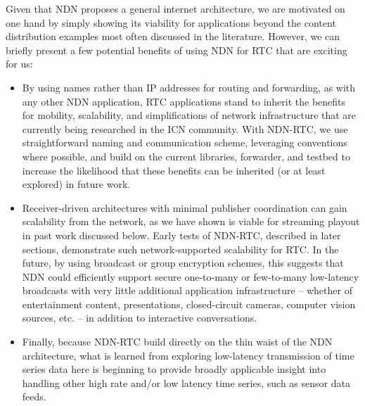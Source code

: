 \documentclass{icn/sig-alternate-2013} %
\newcommand{\ndnrtcName}{NDN-RTC} %
\begin{document}
Given that NDN proposes a general internet architecture, we are motivated on one hand by simply showing its viability for applications beyond the content distribution examples most often discussed in the literature.  However, we can briefly present a few potential benefits of using NDN for RTC that are exciting for us: 
\begin{itemize}
\item By using names rather than IP addresses for routing and forwarding, as with any other NDN application, RTC applications stand to inherit the benefits for mobility, scalability, and simplifications of network infrastructure that are currently being researched in the ICN community. With \ndnrtcName{}, we use  straightforward naming and communication scheme, leveraging conventions where possible, and build on the current libraries, forwarder, and  testbed to increase the likelihood that these benefits can be inherited (or at least explored) in future work. 
\item Receiver-driven architectures with minimal publisher coordination can gain scalability from the network, as we have shown is viable for streaming playout in past work discussed below. Early tests of \ndnrtcName{}, described in later sections,  demonstrate such network-supported scalability for RTC. In the future,  by using broadcast or group encryption schemes, this suggests that NDN could efficiently support secure one-to-many or few-to-many low-latency broadcasts with very little additional application infrastructure -- whether of entertainment content, presentations, closed-circuit cameras, computer vision sources, etc. -- in addition to interactive conversations. 
\item Finally, because \ndnrtcName{} build directly on the thin waist of the NDN architecture, what is learned from exploring low-latency transmission of time series data here is beginning to provide broadly applicable insight into handling other high rate and/or low latency time series, such as sensor data feeds.  
\end{itemize}
\end{document}
